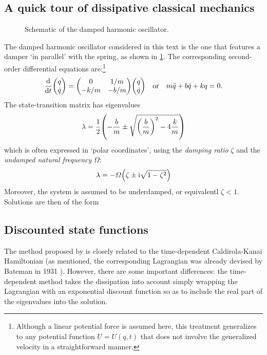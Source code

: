 \subsection{A quick tour of dissipative classical mechanics}
\begin{figure}[ht]
    \centering
    
    \caption{Schematic of the damped harmonic oscillator.}
    \label{fig:dho}
\end{figure}

The damped harmonic oscillator considered in this text is the one that features a damper `in parallel' with the spring, as shown in \cref{fig:dho}. The corresponding second-order differential equations are:\footnote{Although a linear potential force is assumed here, this treatment generalizes to any potential function $U = U(q, t)$ that does not involve the generalized velocity in a straightforward manner.}
\begin{equation}
    \dv{}{t}\mqty(q\\\dot{q}) = \mqty(0 & 1/m\\-k/m & -b/m)\mqty(q\\\dot{q}) \quad \text{or}\quad m\ddot{q} + b\dot{q} + kq = 0.
    \label{eq:dho}
\end{equation}
The state-transition matrix has eigenvalues
$$ \lambda = \frac{1}{2}\qty(-\frac{b}{m}\pm\sqrt{\qty(\frac{b}{m})^2 - 4\frac{k}{m}}) $$
which is often expressed in `polar coordinates', using the \emph{damping ratio} $\zeta$ and the \emph{undamped natural frequency} $\Omega$:
$$ \lambda = -\Omega \qty(\zeta \pm \mathrm{i}\sqrt{1 - \zeta^2}) $$
Moreover, the system is assumed to be underdamped, or equivalentl $\zeta < 1$. Solutions are then of the form
$$ $$

\subsection{Discounted state functions}
The method proposed by \citet{Mendel2021} is closely related to the time-dependent Caldirola-Kanai Hamiltonian (as mentioned, the corresponding Lagrangian was already devised by Bateman in 1931 \cite{Bateman1931, Dekker1981}). However, there are some important differences: the time-dependent method takes the dissipation into account simply wrapping the Lagrangian with an exponential discount function so as to include the real part of the eigenvalues into the solution.


